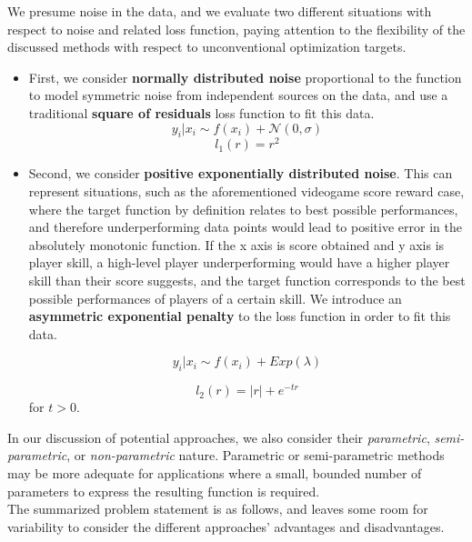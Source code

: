 \documentclass[12pt,a4paper]{article}
\begin{document}
We presume noise in the data, and we evaluate two different situations with respect to noise and related loss function, paying attention to the flexibility of the discussed methods with respect to unconventional optimization targets.
\begin{itemize}
\item First, we consider {\bf{normally distributed noise}} proportional to the function to model symmetric noise from independent sources on the data, and use a traditional {\bf{square of residuals}} loss function to fit this data.
\begin{equation}
y_i | x_i \sim f(x_i) + \mathcal{N}(0,\sigma)
\end{equation}
\begin{equation}
l_1(r) = r^2
\end{equation}

\item Second, we consider {\bf{positive exponentially distributed noise}}. This can represent situations, such as the aforementioned videogame score reward case, where the target function by definition relates to best possible performances, and therefore underperforming data points would lead to positive error in the absolutely monotonic function. If the x axis is score obtained and y axis is player skill, a high-level player underperforming would have a higher player skill than their score suggests, and the target function corresponds to the best possible performances of players of a certain skill. We introduce an {\bf{asymmetric exponential penalty}} to the loss function in order to fit this data.

\begin{equation}
y_i | x_i \sim f(x_i) + Exp(\lambda)
\end{equation}

\begin{equation}
l_2(r) = |r| + e^{-tr}
\end{equation}
\noindent for $t > 0$.
\end{itemize}

In our discussion of potential approaches, we also consider their {\emph{parametric}}, {\emph{semi-parametric}}, or {\emph{non-parametric}} nature. Parametric or semi-parametric methods may be more adequate for applications where a small, bounded number of parameters to express the resulting function is required.\\

The summarized problem statement is as follows, and leaves some room for variability to consider the different approaches' advantages and disadvantages.
\end{document}
